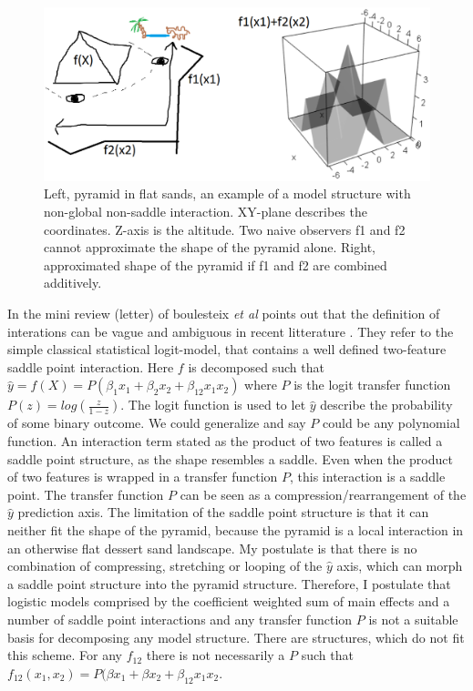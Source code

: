 \begin{figure}
\includegraphics[width=\textwidth,height=\textheight,keepaspectratio]{graphics/sketch_pyramid_interaction.png}
\caption{Left, pyramid in flat sands, an example of a model structure with non-global non-saddle interaction. XY-plane describes the coordinates. Z-axis is the altitude. Two naive observers f1 and f2 cannot approximate the shape of the pyramid alone. Right, approximated shape of the pyramid if f1 and f2 are combined additively.}
\label{pyramid}
\end{figure}

In the mini review (letter) of boulesteix \textit{et al} points out that the definition of interations can be vague and ambiguous in recent litterature \cite{boulesteix2014letter}. They refer to the simple classical statistical logit-model, that contains a well defined two-feature saddle point interaction. Here $f$ is decomposed such that $\hat{y} = f(X) = P(\beta_1 x_1 + \beta_2 x_2 + \beta_{12} x_1 x_2)$ where $P$ is the logit transfer function $P(z) = log(\frac{z}{1-z})$. The logit function is used to let $\hat{y}$ describe the probability of some binary outcome. We could generalize and say $P$ could be any polynomial function. An interaction term stated as the product of two features is called a saddle point structure, as the shape resembles a saddle. Even when the product of two features is wrapped in a transfer function $P$, this interaction is a saddle point. The transfer function $P$ can be seen as a compression/rearrangement of the $\hat{y}$ prediction axis. The limitation of the saddle point structure is that it can neither fit the shape of the pyramid, because the pyramid is a local interaction in an otherwise flat dessert sand landscape. My postulate is that there is no combination of compressing, stretching or looping of the $\hat{y}$ axis, which can morph a saddle point structure into the pyramid structure. Therefore, I postulate that logistic models comprised by the coefficient weighted sum of main effects and a number of saddle point interactions and any transfer function $P$ is not a suitable basis for decomposing any model structure. There are structures, which do not fit this scheme. For any $f_{12}$ there is not necessarily a $P$ such that $f_{12}(x_1,x_2) = P(\beta x_1+ \beta x_2 + \beta_{12} x_1 x_2$. 

